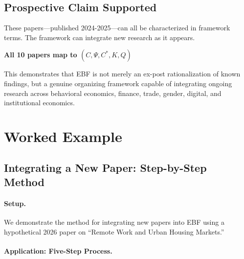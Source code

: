 \subsection{Prospective Claim Supported}

These papers---published 2024-2025---can all be characterized in framework terms.
The framework can integrate new research as it appears.

\begin{tcolorbox}[colback=green!5!white, colframe=green!75!black,
    title=Prospective Validation Result]
\textbf{All 10 papers map to $(C, \Psi, C^*, K, Q)$}

This demonstrates that EBF is not merely an ex-post rationalization of known
findings, but a genuine organizing framework capable of integrating ongoing
research across behavioral economics, finance, trade, gender, digital, and
institutional economics.
\end{tcolorbox}


\section{Worked Example}
\label{sec:J-example}

\subsection{Integrating a New Paper: Step-by-Step Method}

\paragraph{Setup.}
We demonstrate the method for integrating new papers into EBF using a
hypothetical 2026 paper on ``Remote Work and Urban Housing Markets.''

\paragraph{Application: Five-Step Process.}

